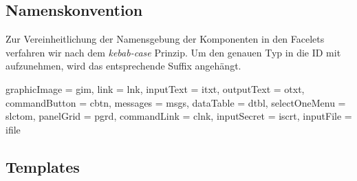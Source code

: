 \newcommand{\ftable}[1]{\begin{sidewaystable}
\begin{tabular}[H]{ |m{1.5cm}| m{1.5cm}| m{3cm}| m{7cm} |m{4cm}| m{4cm}| }
    \hline
    \textbf{ID} & \textbf{Typ} & \textbf{Beschreibung} & \textbf{Binding} & \textbf{Constraints} & \textbf{Validator \newline Converter} \\
    \hline\hline
    #1
\end{tabular}
\end{sidewaystable}
}

\newcommand{\fentry}[6]{\footnotesize#1 &\footnotesize#2 &\footnotesize#3 &\footnotesize#4 &\footnotesize#5 &\footnotesize#6\\\hline}


\subsection{Namenskonvention}

Zur Vereinheitlichung der Namensgebung der Komponenten in den Facelets verfahren wir nach dem \emph{kebab-case} Prinzip. Um den genauen Typ in die ID mit aufzunehmen, wird das entsprechende Suffix angehängt.

 graphicImage = gim, link = lnk, inputText = itxt, outputText = otxt, commandButton = cbtn, messages = msgs, dataTable = dtbl, selectOneMenu = slctom, panelGrid = pgrd, commandLink = clnk, inputSecret = iscrt, inputFile = ifile

\subsection{Templates}

